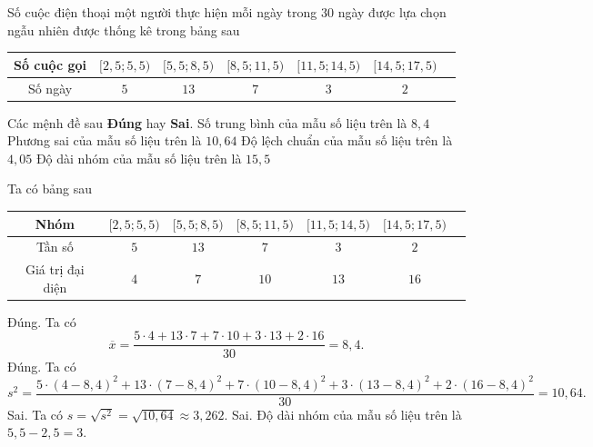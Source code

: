 \begin{ex}%
	Số cuộc điện thoại một người thực hiện mỗi ngày trong $30$ ngày được lựa chọn ngẫu nhiên được thống kê trong bảng sau
	\begin{center}
		\begin{tabular}{|c|c|c|c|c|c|c|}
			\hline
			Số cuộc gọi & $[2{,}5;5{,}5)$ & $[5{,}5;8{,}5)$ & $[8{,}5;11{,}5)$ & $[11{,}5;14{,}5)$ & $[14{,}5;17{,}5)$ \\
			\hline
			Số ngày & $5$ & $13$ & $7$ & $3$ & $2$ \\
			\hline
		\end{tabular}
	\end{center}
	Các mệnh đề sau \textbf{Đúng} hay \textbf{Sai}.
	\choiceTF
	{\True Số trung bình của mẫu số liệu trên là $8{,}4$}
	{\True Phương sai của mẫu số liệu trên là $10{,}64$}
	{Độ lệch chuẩn của mẫu số liệu trên là $4{,}05$}
	{Độ dài nhóm của mẫu số liệu trên là $15{,}5$}
	\loigiai
	{
		Ta có bảng sau
		\begin{center}
			\begin{tabular}{|c|c|c|c|c|c|c|}
				\hline
				Nhóm & $[2{,}5;5{,}5)$ & $[5{,}5;8{,}5)$ & $[8{,}5;11{,}5)$ & $[11{,}5;14{,}5)$ & $[14{,}5;17{,}5)$ \\
				\hline
				Tần số & $5$ & $13$ & $7$ & $3$ & $2$ \\
				\hline
				Giá trị đại diện & $4$ & $7$ & $10$ & $13$ & $16$\\
				\hline
			\end{tabular}
		\end{center}
		\begin{itemchoice}
			\itemch Đúng. Ta có 
			\[\overline{x}=\frac{5\cdot4+13\cdot7+7\cdot10+3\cdot13+2\cdot16}{30}=8{,}4.\]
			\itemch Đúng. Ta có 
			\[s^2=\frac{5\cdot(4-8{,4})^2+13\cdot(7-8{,}4)^2+7\cdot(10-8{,}4)^2+3\cdot(13-8{,}4)^2+2\cdot(16-8{,}4)^2}{30}=10{,}64.\]
			\itemch Sai. Ta có $s=\sqrt{s^2}=\sqrt{10{,}64}\approx3{,}262$.
			\itemch Sai. Độ dài nhóm của mẫu số liệu trên là $5{,}5-2{,}5=3$.
		\end{itemchoice}
	}
\end{ex}

